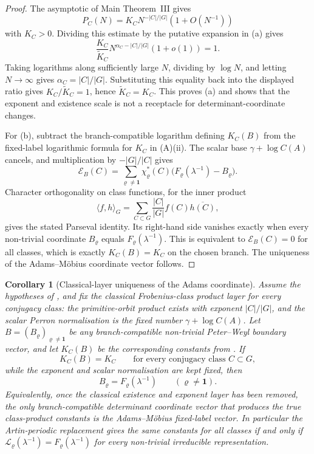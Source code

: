 \documentclass[11pt,a4paper]{amsart}
\theoremstyle{plain}
\newtheorem{corollary}[theorem]{Corollary}
\theoremstyle{definition}
\theoremstyle{remark}
\begin{document}
\begin{proof}
  The asymptotic of Main Theorem~III gives
  \[
    P_C(N)=K_C N^{-|C|/|G|}(1+O(N^{-1}))
  \]
  with \(K_C>0\).  Dividing this estimate by the putative expansion in
  \textup{(a)} gives
  \[
    \frac{K_C}{\widetilde K_C}
    N^{\alpha_C-|C|/|G|}(1+o(1))=1.
  \]
  Taking logarithms along sufficiently large \(N\), dividing by \(\log N\), and
  letting \(N\to\infty\) gives \(\alpha_C=|C|/|G|\).  Substituting this equality
  back into the displayed ratio gives \(K_C/\widetilde K_C=1\), hence
  \(\widetilde K_C=K_C\).  This proves \textup{(a)} and shows that the exponent
  and existence scale is not a receptacle for determinant-coordinate changes.

  For \textup{(b)}, subtract the branch-compatible logarithm defining
  \(K_C(B)\) from the fixed-label logarithmic formula for \(K_C\) in
  \textup{(A)(ii)}.  The scalar base
  \(\gamma+\log C(A)\) cancels, and multiplication by \(-|G|/|C|\) gives
  \[
    \mathscr E_B(C)=
    \sum_{\varrho\ne\mathbf1}\chi_\varrho^\ast(C)
    \bigl(F_\varrho(\lambda^{-1})-B_\varrho\bigr).
  \]
  Character orthogonality on class functions, for the inner product
  \[
    \langle f,h\rangle_G
    =\sum_{C\subset G}\frac{|C|}{|G|}f(C)\overline{h(C)},
  \]
  gives the stated Parseval identity.
  Its right-hand side vanishes exactly when every non-trivial coordinate
  \(B_\varrho\) equals \(F_\varrho(\lambda^{-1})\).  This is equivalent to
  \(\mathscr E_B(C)=0\) for all classes, which is exactly
  \(K_C(B)=K_C\) on the chosen branch.  The uniqueness of the Adams--M\"obius
  coordinate vector follows.
\end{proof}

\begin{corollary}[Classical-layer uniqueness of the Adams coordinate]
  \label{cor:class-product-classical-layer-uniqueness}
  Assume the hypotheses of , and fix the
  classical Frobenius-class product layer for every conjugacy class: the
  primitive-orbit product exists with exponent \(|C|/|G|\), and the scalar
  Perron normalisation is the fixed number \(\gamma+\log C(A)\).  Let
  \(B=(B_\varrho)_{\varrho\ne\mathbf1}\) be any branch-compatible non-trivial
  Peter--Weyl boundary vector, and let \(K_C(B)\) be the corresponding constants
  from .  If
  \[
    K_C(B)=K_C
    \qquad\text{for every conjugacy class }C\subset G,
  \]
  while the exponent and scalar normalisation are kept fixed, then
  \[
    B_\varrho=F_\varrho(\lambda^{-1})
    \qquad(\varrho\ne\mathbf1).
  \]
  Equivalently, once the classical existence and exponent layer has been
  removed, the only branch-compatible determinant coordinate vector that
  produces the true class-product constants is the Adams--M\"obius fixed-label
  vector.  In particular the Artin-periodic replacement gives the same constants
  for all classes if and only if
  \(\mathcal L_\varrho(\lambda^{-1})=F_\varrho(\lambda^{-1})\) for every
  non-trivial irreducible representation.
\end{corollary}
\end{document}
